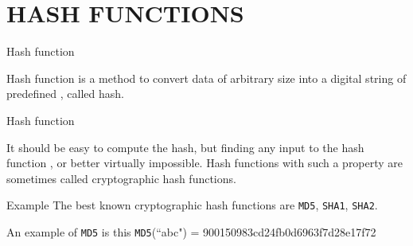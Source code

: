 \documentclass[serif]{beamer}
\begin{document}
\section{HASH FUNCTIONS}
\begin{frame}{Hash function}
	\begin{definition}
		Hash function is a method to convert data of arbitrary size
		into a digital string of predefined {\color{red}{fixed length}}, called hash.
	\end{definition}
\end{frame}
\begin{frame}{Hash function}
		\begin{definition}
			It should be easy to compute the hash, but finding any input to the hash
			function {\color{red}{must be difficult}}, or better virtually impossible. Hash functions with such a property are sometimes called
			cryptographic hash functions.
		\end{definition}
\end{frame}
\begin{frame}{Example}
	The best known cryptographic hash functions are
	{\tt MD5}, {\tt SHA1}, {\tt SHA2}. 
	\begin{example}
		An example of {\tt MD5} is this
		{\tt MD5}(``abc") = 900150983cd24fb0d6963f7d28e17f72
	\end{example}
\end{frame}
\end{document}
